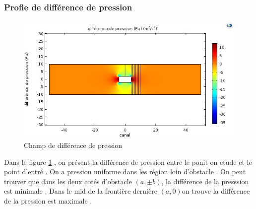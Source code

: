 \documentclass[a4paper,11pt]{report} %
\begin{document}
\subsubsection{Profie de différence de pression}
\begin{figure}[!h]
\centering
\hspace*{0mm}\vfill
\begin{center} \includegraphics[width=1.\textwidth]{pression_surface.jpg} \end{center}
\vfill\hspace*{0mm}
\caption{Champ de différence de pression  }
\label{pression_surface}
\end{figure}\pagebreak
Dans le figure \ref{pression_surface} , on présent la différence de pression entre le ponit on etude et le point d'entré  . On a pression uniforme dans les région loin d'obstacle . On peut trouver que dans les deux cotés d'obstacle $(a,\pm b)$, la différence de la presssion est minimale . Dans le mid de la frontière dernière $(a,0)$on trouve la différence de la pression est maximale . 
\end{document}
